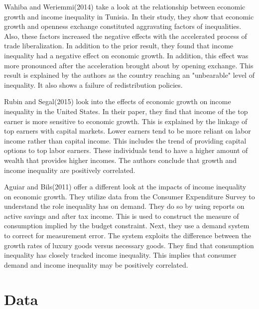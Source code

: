 \documentclass{article}
\begin{document}
\quad Wahiba and Weriemmi(2014) take a look at the relationship between economic growth and income inequality in Tunisia.  In their study, they show that economic growth and openness exchange constituted aggravating factors of inequalities.  Also, these factors increased the negative  effects with the accelerated process of trade liberalization.  In addition to the prior result, they found that income inequality had a negative effect on economic growth.  In addition, this effect was more pronounced after the acceleration brought about by opening exchange.  This result is explained by the authors as the country reaching an "unbearable" level of inequality.  It also shows a failure of redistribution policies.  
\vspace{2mm}

\quad Rubin and Segal(2015) look into the effects of economic growth on income inequality in the United States.  In their paper, they find that income of the top earner is more sensitive to economic growth.  This is explained by the linkage of top earners with capital markets.  Lower earners tend to be more reliant on labor income rather than capital income.  This includes the trend of providing capital options to top labor earners.  These individuals tend to have a higher amount of wealth that provides higher incomes. The authors conclude that growth and income inequality are positively correlated. 
\vspace{2mm}

\quad Aguiar and Bils(2011) offer a different look at the impacts of income inequality on economic growth.  They utilize data from the Consumer Expenditure Survey to understand the role inequality has on demand.  They do so by using reports on active savings and after tax income.  This is used to construct the measure of consumption implied by the budget constraint.  Next, they use a demand system to correct for measurement error.  The system exploits the difference between the growth rates of luxury goods versus necessary goods.  They find that consumption inequality has closely tracked income inequality.  This implies that consumer demand and income inequality may be positively correlated.  

\section{Data}
\vspace{2mm}
\end{document}
